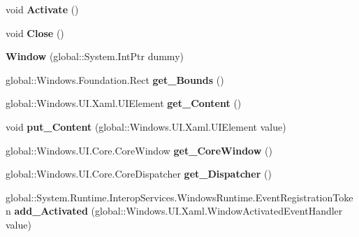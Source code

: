 \begin{DoxyCompactItemize}
void {\bfseries Activate} ()
\item 
\mbox{\label{class_windows_1_1_u_i_1_1_xaml_1_1_window_ab6b6a8e512a08f5ba35b8bc367dfeea8}} 
void {\bfseries Close} ()
\item 
\mbox{\label{class_windows_1_1_u_i_1_1_xaml_1_1_window_a2f884c667c9bd45a983c8611d71c365b}} 
{\bfseries Window} (global\+::\+System.\+Int\+Ptr dummy)
\item 
\mbox{\label{class_windows_1_1_u_i_1_1_xaml_1_1_window_a3b4023c9ffd4210037266cde25034d90}} 
global\+::\+Windows.\+Foundation.\+Rect {\bfseries get\+\_\+\+Bounds} ()
\item 
\mbox{\label{class_windows_1_1_u_i_1_1_xaml_1_1_window_ae8eec75ce505d25ba6c2553adc1784b5}} 
global\+::\+Windows.\+U\+I.\+Xaml.\+U\+I\+Element {\bfseries get\+\_\+\+Content} ()
\item 
\mbox{\label{class_windows_1_1_u_i_1_1_xaml_1_1_window_ad4e7eb6e2bbbcc9db175cc0467fa6060}} 
void {\bfseries put\+\_\+\+Content} (global\+::\+Windows.\+U\+I.\+Xaml.\+U\+I\+Element value)
\item 
\mbox{\label{class_windows_1_1_u_i_1_1_xaml_1_1_window_a4ea24c3c21a169c23a2ae6ca99188f43}} 
global\+::\+Windows.\+U\+I.\+Core.\+Core\+Window {\bfseries get\+\_\+\+Core\+Window} ()
\item 
\mbox{\label{class_windows_1_1_u_i_1_1_xaml_1_1_window_a209f50e7cf5593a7150291903f99e541}} 
global\+::\+Windows.\+U\+I.\+Core.\+Core\+Dispatcher {\bfseries get\+\_\+\+Dispatcher} ()
\item 
\mbox{\label{class_windows_1_1_u_i_1_1_xaml_1_1_window_a9c86b88ed3cf1a52a88a638b75e01fa7}} 
global\+::\+System.\+Runtime.\+Interop\+Services.\+Windows\+Runtime.\+Event\+Registration\+Token {\bfseries add\+\_\+\+Activated} (global\+::\+Windows.\+U\+I.\+Xaml.\+Window\+Activated\+Event\+Handler value)
\item 

\end{DoxyCompactItemize}

